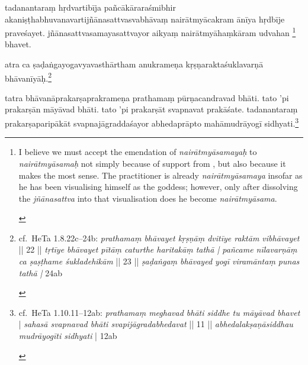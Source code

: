 \documentclass[naipra.tex]{subfiles}
\begin{document}
\begin{sanskrit}
\pstart
tadanantaraṃ hṛdvartibīja pañcākāraraśmibhir akaniṣṭhabhuvanavartijñānasattvasvabhāvaṃ nairātmyācakram ānīya hṛdbīje praveśayet.
jñānasattvasamayasattvayor aikyaṃ  nairātmyāhaṃkāram udvahan \footnote{
	\begin{english}%
		I believe we must accept the emendation of \emph{nairātmyāsamayaḥ} to \emph{nairātmyāsamaḥ} not simply because of support from \TIB , but also because it makes the most sense.
		The practitioner is already \emph{nairātmyāsamaya} insofar as he has been visualising himself as the goddess; however, only after dissolving the \emph{jñānasattva} into that visualisation does he become \emph{nairātmyāsama}.
	\end{english}
} bhavet. 
\pend



\pstart
atra ca ṣaḍaṅgayogavyavasthārtham anukrameṇa kṛṣṇaraktaśuklavarṇā bhāvanīyāḥ.\footnote{
	\begin{english}%
		cf.\ HeTa 1.8.22c–24b: \emph{prathamaṃ bhāvayet kṛṣṇāṃ dvitīye raktām vibhāvayet} || 22 || \emph{tṛtīye bhāvayet pītāṃ caturthe haritakāṃ tathā | pañcame nīlavarṇāṃ ca ṣaṣṭhame śukladehikām }|| 23 || \emph{ṣaḍaṅgaṃ bhāvayed yogī viramāntaṃ punas tathā |} 24ab
	\end{english}
} 
\pend



\pstart
tatra bhāvanāprakarṣaprakrameṇa prathamaṃ pūrṇacandravad bhāti.
tato 'pi prakarṣān māyāvad bhāti.
tato 'pi prakarṣāt svapnavat prakāśate.
tadanantaraṃ prakarṣaparipākāt svapnajāgraddaśayor abhedaprāpto mahāmudrāyogī sidhyati.\footnote{
	\begin{english}%
		cf.\ HeTa 1.10.11–12ab: \emph{prathamaṃ meghavad bhāti siddhe tu māyāvad bhavet} | \emph{sahasā svapnavad bhāti svapijāgradabhedavat} || 11 || \emph{abhedalakṣaṇāsiddhau mudrāyogīti sidhyati} | 12ab


\end{english}}
\end{sanskrit}
\end{document}
